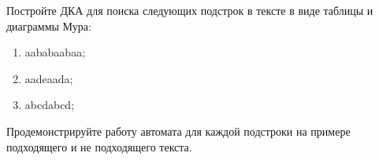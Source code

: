 \question 
Постройте ДКА для поиска следующих подстрок в тексте в виде таблицы и диаграммы Мура:
\begin{enumerate}
\item  aababaabaa;
\item  aadeaada;
\item  abcdabcd;
\end{enumerate}
Продемонстрируйте работу автомата для каждой подстроки на примере подходящего и не подходящего текста.
